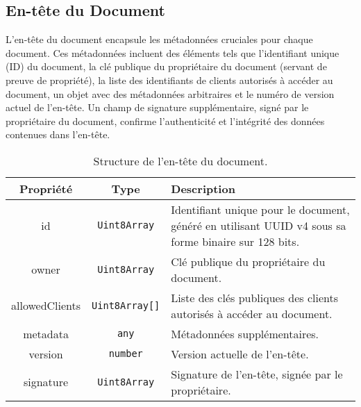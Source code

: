 \subsection{En-tête du Document \label{doc_header}}

L'en-tête du document encapsule les métadonnées cruciales pour chaque document.
Ces métadonnées incluent des éléments tels que l'identifiant unique (ID) du document, la clé publique du propriétaire du document (servant de preuve de propriété), la liste des identifiants de clients autorisés à accéder au document, un objet avec des métadonnées arbitraires et le numéro de version actuel de l'en-tête. Un champ de signature supplémentaire, signé par le propriétaire du document, confirme l'authenticité et l'intégrité des données contenues dans l'en-tête.

\setlength{\extrarowheight}{2pt}

\begin{table}[h]
    \begin{center}
        \caption{Structure de l'en-tête du document.}
        \begin{tabularx}{\textwidth}{|c|c|X|}
            \hline
            \rowcolor{gray!20}
            \textbf{Propriété} & \textbf{Type}         & \textbf{Description}                                                                                 \\
            \hline
            id                 & \texttt{Uint8Array}   & Identifiant unique pour le document, généré en utilisant UUID v4 sous sa forme binaire sur 128 bits. \\
            \hline
            owner              & \texttt{Uint8Array}   & Clé publique du propriétaire du document.                                                            \\
            \hline
            allowedClients     & \texttt{Uint8Array[]} & Liste des clés publiques des clients autorisés à accéder au document.                                \\
            \hline
            metadata           & \texttt{any}          & Métadonnées supplémentaires.                                                                         \\
            \hline
            version            & \texttt{number}       & Version actuelle de l'en-tête.                                                                       \\
            \hline
            signature          & \texttt{Uint8Array}   & Signature de l'en-tête, signée par le propriétaire.                                                  \\
            \hline
        \end{tabularx}
    \end{center}
\end{table}



